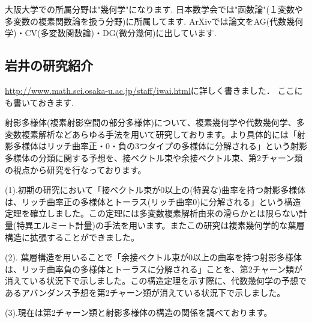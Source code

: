 大阪大学での所属分野は"幾何学"になります. 日本数学会では"函数論"(１変数や多変数の複素関数論を扱う分野)に所属してます. ArXivでは論文をAG(代数幾何学)・CV(多変数関数論)・DG(微分幾何)に出しています. 

\subsection{岩井の研究紹介}
\url{http://www.math.sci.osaka-u.ac.jp/staff/iwai.html}に詳しく書きました．
ここにも書いておきます. 

\begin{tcolorbox}[mybox]

\hspace{12pt}射影多様体(複素射影空間の部分多様体)について、複素幾何学や代数幾何学、多変数複素解析などあらゆる手法を用いて研究しております。より具体的には「射影多様体はリッチ曲率正・0・負の3つタイプの多様体に分解される」という射影多様体の分類に関する予想を、接ベクトル束や余接ベクトル束、第2チャーン類の視点から研究を行なっております。
\vspace{5pt}

(1).初期の研究において「接ベクトル束が0以上の(特異な)曲率を持つ射影多様体は、リッチ曲率正の多様体とトーラス(リッチ曲率0)に分解される」という構造定理を確立しました。この定理には多変数複素解析由来の滑らかとは限らない計量(特異エルミート計量)の手法を用います。またこの研究は複素幾何学的な葉層構造に拡張することができました。
\vspace{5pt}

(2). 葉層構造を用いることで「余接ベクトル束が0以上の曲率を持つ射影多様体は、リッチ曲率負の多様体とトーラスに分解される」ことを、第2チャーン類が消えている状況下で示しました。この構造定理を示す際に、代数幾何学の予想であるアバンダンス予想を第2チャーン類が消えている状況下で示しました。
\vspace{5pt}

(3).現在は第2チャーン類と射影多様体の構造の関係を調べております。
\end{tcolorbox}

